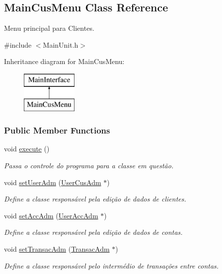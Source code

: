 \hypertarget{classMainCusMenu}{\subsection{Main\-Cus\-Menu Class Reference}
\label{dc/d35/classMainCusMenu}
}


Menu principal para Clientes.  




{\ttfamily \#include $<$Main\-Unit.\-h$>$}

Inheritance diagram for Main\-Cus\-Menu\-:\begin{figure}[H]
\begin{center}
\leavevmode
\includegraphics[height=2.000000cm]{dc/d35/classMainCusMenu}
\end{center}
\end{figure}
\subsubsection*{Public Member Functions}
\begin{DoxyCompactItemize}
\item 
void \hyperlink{classMainCusMenu_a91a3ffa75a1deb30dfc6eb604f1a1a2d}{execute} ()
\begin{DoxyCompactList}\small\item\em Passa o controle do programa para a classe em questão. \end{DoxyCompactList}\item 
void \hyperlink{classMainCusMenu_aea07e41b2f2c24496e3ce7a8f55b5332}{set\-User\-Adm} (\hyperlink{classUserCusAdm}{User\-Cus\-Adm} $\ast$)
\begin{DoxyCompactList}\small\item\em Define a classe responsável pela edição de dados de clientes. \end{DoxyCompactList}\item 
void \hyperlink{classMainCusMenu_acaa0828f9ac38816e5a6068f1781f9be}{set\-Acc\-Adm} (\hyperlink{classUserAccAdm}{User\-Acc\-Adm} $\ast$)
\begin{DoxyCompactList}\small\item\em Define a classe responsável pela edição de dados de contas. \end{DoxyCompactList}\item 
void \hyperlink{classMainCusMenu_aa338655efeeb61c43a8089c5577ce47b}{set\-Transac\-Adm} (\hyperlink{classTransacAdm}{Transac\-Adm} $\ast$)
\begin{DoxyCompactList}\small\item\em Define a classe responsável pelo intermédio de transações entre contas. \end{DoxyCompactList}\end{DoxyCompactItemize}


